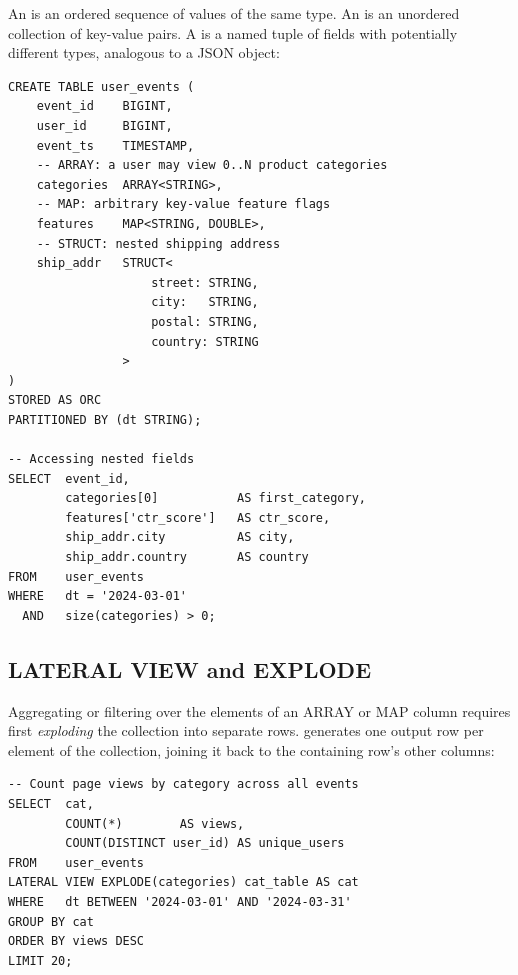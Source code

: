 An  is an ordered sequence of values of the same type. An
 is an unordered collection of key-value pairs. A 
is a named tuple of fields with potentially different types, analogous
to a JSON object:

\begin{lstlisting}[style=hiveql, caption={HiveQL: table schema with complex data types}]
CREATE TABLE user_events (
    event_id    BIGINT,
    user_id     BIGINT,
    event_ts    TIMESTAMP,
    -- ARRAY: a user may view 0..N product categories
    categories  ARRAY<STRING>,
    -- MAP: arbitrary key-value feature flags
    features    MAP<STRING, DOUBLE>,
    -- STRUCT: nested shipping address
    ship_addr   STRUCT<
                    street: STRING,
                    city:   STRING,
                    postal: STRING,
                    country: STRING
                >
)
STORED AS ORC
PARTITIONED BY (dt STRING);

-- Accessing nested fields
SELECT  event_id,
        categories[0]           AS first_category,
        features['ctr_score']   AS ctr_score,
        ship_addr.city          AS city,
        ship_addr.country       AS country
FROM    user_events
WHERE   dt = '2024-03-01'
  AND   size(categories) > 0;
\end{lstlisting}

\subsection{LATERAL VIEW and EXPLODE}
\label{subsec:lateral-view}

Aggregating or filtering over the elements of an ARRAY or MAP column
requires first \emph{exploding} the collection into separate rows.
 generates one output row per element of the
collection, joining it back to the containing row's other columns:

\begin{lstlisting}[style=hiveql, caption={HiveQL: LATERAL VIEW EXPLODE to unnest an array}]
-- Count page views by category across all events
SELECT  cat,
        COUNT(*)        AS views,
        COUNT(DISTINCT user_id) AS unique_users
FROM    user_events
LATERAL VIEW EXPLODE(categories) cat_table AS cat
WHERE   dt BETWEEN '2024-03-01' AND '2024-03-31'
GROUP BY cat
ORDER BY views DESC
LIMIT 20;
\end{lstlisting}

